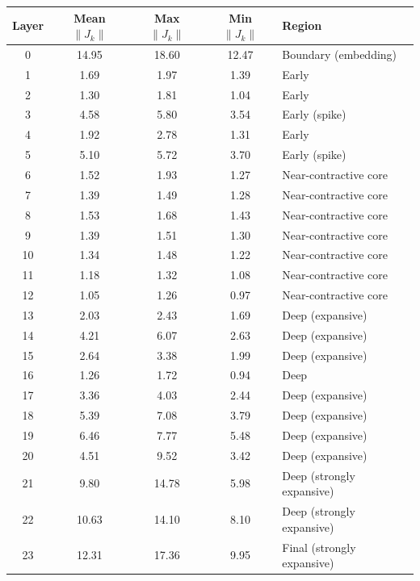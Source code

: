 \documentclass{article}
\newenvironment{tabhere}{%
  \par\medskip
  \begin{center}
}{%
  \end{center}
  \medskip
}
\begin{document}
\begin{tabhere}
\begin{tabular}{ccccl}
\toprule
Layer & Mean $\|J_k\|$ & Max $\|J_k\|$ & Min $\|J_k\|$ & Region \\
\midrule
0 & 14.95 & 18.60 & 12.47 & Boundary (embedding) \\
1 & 1.69 & 1.97 & 1.39 & Early \\
2 & 1.30 & 1.81 & 1.04 & Early \\
3 & 4.58 & 5.80 & 3.54 & Early (spike) \\
4 & 1.92 & 2.78 & 1.31 & Early \\
5 & 5.10 & 5.72 & 3.70 & Early (spike) \\
\midrule
6 & 1.52 & 1.93 & 1.27 & Near-contractive core \\
7 & 1.39 & 1.49 & 1.28 & Near-contractive core \\
8 & 1.53 & 1.68 & 1.43 & Near-contractive core \\
9 & 1.39 & 1.51 & 1.30 & Near-contractive core \\
10 & 1.34 & 1.48 & 1.22 & Near-contractive core \\
11 & 1.18 & 1.32 & 1.08 & Near-contractive core \\
12 & 1.05 & 1.26 & 0.97 & Near-contractive core \\
\midrule
13 & 2.03 & 2.43 & 1.69 & Deep (expansive) \\
14 & 4.21 & 6.07 & 2.63 & Deep (expansive) \\
15 & 2.64 & 3.38 & 1.99 & Deep (expansive) \\
16 & 1.26 & 1.72 & 0.94 & Deep \\
17 & 3.36 & 4.03 & 2.44 & Deep (expansive) \\
18 & 5.39 & 7.08 & 3.79 & Deep (expansive) \\
19 & 6.46 & 7.77 & 5.48 & Deep (expansive) \\
20 & 4.51 & 9.52 & 3.42 & Deep (expansive) \\
21 & 9.80 & 14.78 & 5.98 & Deep (strongly expansive) \\
22 & 10.63 & 14.10 & 8.10 & Deep (strongly expansive) \\
23 & 12.31 & 17.36 & 9.95 & Final (strongly expansive) \\
\bottomrule
\end{tabular}
\label{tab:jacobian_pythia}
\end{tabhere}
\end{document}
